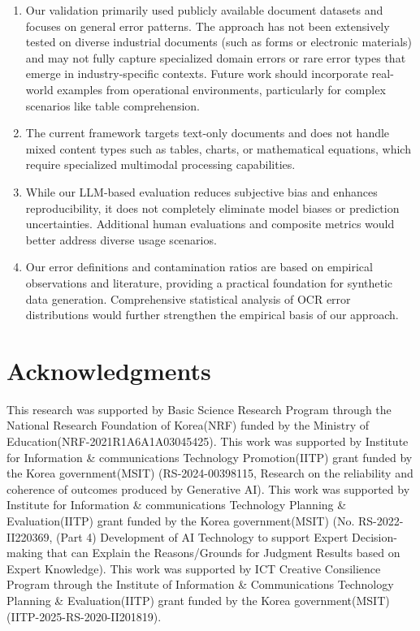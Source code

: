 \documentclass[11pt]{article}
\begin{document}
\begin{enumerate}
    \item Our validation primarily used publicly available document datasets and focuses on general error patterns. The approach has not been extensively tested on diverse industrial documents (such as forms or electronic materials) and may not fully capture specialized domain errors or rare error types that emerge in industry-specific contexts. Future work should incorporate real-world examples from operational environments, particularly for complex scenarios like table comprehension.

    \item The current framework targets text-only documents and does not handle mixed content types such as tables, charts, or mathematical equations, which require specialized multimodal processing capabilities.
    
    \item While our LLM-based evaluation reduces subjective bias and enhances reproducibility, it does not completely eliminate model biases or prediction uncertainties. Additional human evaluations and composite metrics would better address diverse usage scenarios.

    \item Our error definitions and contamination ratios are based on empirical observations and literature, providing a practical foundation for synthetic data generation. Comprehensive statistical analysis of OCR error distributions would further strengthen the empirical basis of our approach.
    
\end{enumerate}







\section*{Acknowledgments}

This research was supported by Basic Science Research Program through the National Research Foundation of Korea(NRF) funded by the Ministry of Education(NRF-2021R1A6A1A03045425).
This work was supported by Institute for Information \& communications Technology Promotion(IITP) grant funded by the Korea government(MSIT) 
(RS-2024-00398115, Research on the reliability and coherence of outcomes produced by Generative AI).
This work was supported by Institute for Information \& communications Technology Planning \& Evaluation(IITP) grant funded by the Korea government(MSIT) (No. RS-2022-II220369, (Part 4) Development of AI Technology to support Expert Decision-making that can Explain the Reasons/Grounds for Judgment Results based on Expert Knowledge).
This work was supported by ICT Creative Consilience Program through the Institute of Information \& Communications Technology Planning \& Evaluation(IITP) grant funded by the Korea government(MSIT)(IITP-2025-RS-2020-II201819).
\end{document}
